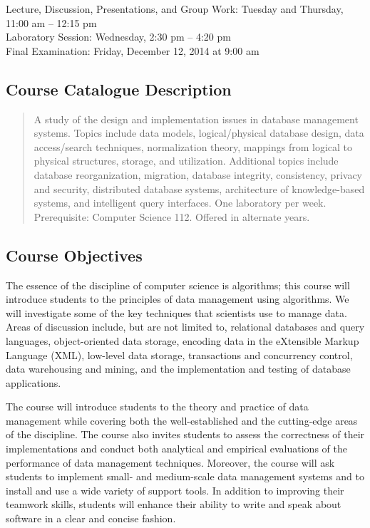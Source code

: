 Lecture, Discussion, Presentations, and Group Work: Tuesday and Thursday, 11:00 am -- 12:15 pm \\
Laboratory Session: Wednesday, 2:30 pm -- 4:20 pm \\
Final Examination: Friday, December 12, 2014 at 9:00 am

\subsection*{Course Catalogue Description}

\begin{quote}

  A study of the design and implementation issues in database management systems. Topics include data models,
  logical/physical database design, data access/search techniques, normalization theory, mappings from logical to physical
  structures, storage, and utilization. Additional topics include database reorganization, migration, database integrity,
  consistency, privacy and security, distributed database systems, architecture of knowledge-based systems, and
  intelligent query interfaces. One laboratory per week. Prerequisite: Computer Science 112.  Offered in alternate years.

\end{quote}

\subsection*{Course Objectives}

The essence of the discipline of computer science is algorithms; this course will introduce students to the principles
of data management using algorithms.  We will investigate some of the key techniques that scientists use to manage data.
Areas of discussion include, but are not limited to, relational databases and query languages, object-oriented data
storage, encoding data in the eXtensible Markup Language (XML), low-level data storage, transactions and concurrency
control, data warehousing and mining, and the implementation and testing of database applications.  

The course will introduce students to the theory and practice of data management while covering both the
well-established and the cutting-edge areas of the discipline.  The course also invites students to assess the
correctness of their implementations and conduct both analytical and empirical evaluations of the performance of data
management techniques.  Moreover, the course will ask students to implement small- and medium-scale data management
systems and to install and use a wide variety of support tools. In addition to improving their teamwork skills, students
will enhance their ability to write and speak about software in a clear and concise fashion. 

